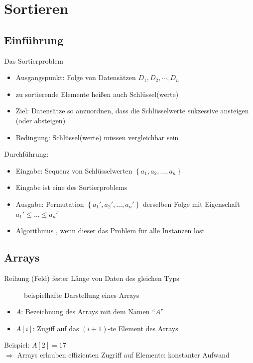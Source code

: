 \documentclass[
    ngerman,
    color=3b,
    load_common, %
    summary,
    boxarc,
]{tuda_summary}
\begin{document}
\section{Sortieren}\label{2}\label{Sortieren}
\subsection{Einführung}\label{2.1}\label{Einfuehrung Sortieren}
Das Sortierproblem\\
\begin{itemize}
    \item Ausgangspunkt: Folge von Datensätzen $D_1,D_2,\cdots,D_n$
          \begin{figure}[h]
              \centering
              \label{fig:folge_von_Datensätzen}
          \end{figure}
          \vspace*{-1em}
    \item zu sortierende Elemente heißen auch Schlüssel(werte)
    \item Ziel:  Datensätze so anzuordnen, dass die Schlüsselwerte sukzessive
          ansteigen (oder absteigen)
    \item Bedingung: Schlüssel(werte) müssen vergleichbar sein
\end{itemize}
Durchführung:\begin{itemize}
    \item Eingabe: Sequenz von Schlüsselwerten $\left\{a_1,a_2,\ldots,a_n\right\}$
    \item Eingabe ist eine  des Sortierproblems
    \item Ausgabe: Permutation $\left\{a_1',a_2',\ldots,a_n'\right\}$ derselben Folge mit Eigenschaft $a_1'\leq\ldots\leq a_n'$
    \item Algorithmus , wenn dieser das Problem für alle Instanzen löst
\end{itemize}
\clearpage
\subsection{Arrays}\label{2.2}\label{Arrays}
Reihung (Feld) fester Länge von Daten des gleichen Typs
\begin{figure}[h]
    \centering
    \caption{beispielhafte Darstellung eines Arrays}
    \label{fig:folge_von_Datensätzen}
\end{figure}
\begin{itemize}
    \item $A$: Bezeichnung des Arrays mit dem Namen "`$A$"'
    \item $A[i]$: Zugiff auf das $(i+1)$-te Element des Arrays
\end{itemize}
Beispiel: $A[2]=17$\\
$\Longrightarrow$ Arrays erlauben effizienten Zugriff auf Elemente: konstanter Aufwand
\end{document}
